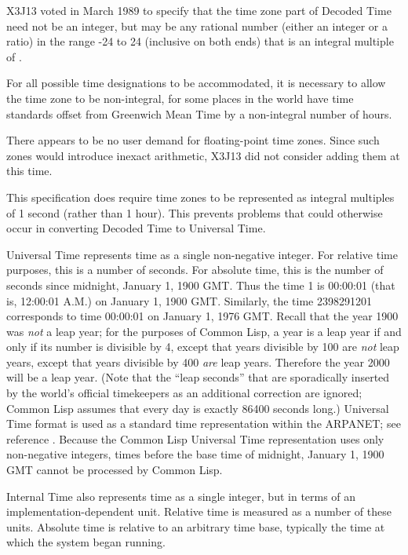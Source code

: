 \begin{newer}
X3J13 voted in March 1989 
to specify that the time zone part of Decoded Time need not be an integer,
but may be any rational number (either an integer or a ratio)
in the range -24 to 24 (inclusive on both ends)
that is an integral multiple of .

\beforenoterule
\begin{rationale}
For all possible time designations to be accommodated, it is
    necessary to allow the time zone to be non-integral, for some places
    in the world have time standards offset from Greenwich Mean Time
    by a non-integral number of hours.

    There appears to be no user demand for floating-point time zones.  Since such
    zones would introduce inexact arithmetic, X3J13 did not consider
    adding them at this time.

This specification does require time zones to be represented as integral multiples
    of 1 second (rather than 1 hour).  This prevents problems that could otherwise
occur in converting Decoded Time to Universal Time.
\end{rationale}
\afternoterule
\end{newer}

Universal Time represents time as a single non-negative integer.
For relative time
purposes, this is a number of seconds.  For absolute time, this is the
number of seconds since midnight, January 1, 1900 {GMT}.  Thus the time 1
is 00:00:01 (that is, 12:00:01 A.M.) on January 1, 1900 {GMT}.
Similarly, the time 2398291201 corresponds to time 00:00:01 on January 1,
1976 {GMT}.
Recall that the year 1900 was \emph{not} a leap year; for the purposes of
Common Lisp, a year is a leap year if and only if its number is divisible by 4, except
that years divisible by 100 are \emph{not} leap years, except that years
divisible by 400 \emph{are} leap years.  Therefore the year 2000 will
be a leap year.
(Note that the ``leap seconds'' that
are sporadically inserted by the world's official timekeepers as an additional
correction are ignored; Common Lisp assumes that every day is exactly 86400
seconds long.)
Universal Time format is used as a standard time
representation within the {ARPANET}; see reference \cite{KLH-TIME-SERVER}.
Because the Common Lisp Universal Time representation uses only
non-negative integers, times before the base time of midnight,
January 1, 1900 {GMT} cannot be processed by Common Lisp.

Internal Time also represents time as a single integer, but
in terms of an implementation-dependent unit.
Relative time is measured as a number of these units.
Absolute time is relative to an arbitrary time base, typically
the time at which the system began running.

